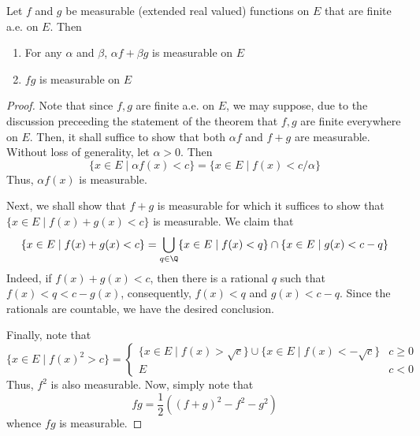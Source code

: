 \begin{theorem}
    Let $f$ and $g$ be measurable (extended real valued) functions on $E$ that are finite a.e. on $E$. Then 
    \begin{enumerate}[label=(\alph*)]
        \item For any $\alpha$ and $\beta$, $\alpha f + \beta g$ is measurable on $E$ 
        \item $fg$ is measurable on $E$
    \end{enumerate}
\end{theorem}
\begin{proof}
Note that since $f,g$ are finite a.e. on $E$, we may suppose, due to the discussion preceeding the statement of the theorem that $f,g$ are finite everywhere on $E$. Then, it shall suffice to show that both $\alpha f$ and $f + g$ are measurable. Without loss of generality, let $\alpha > 0$. Then 
\begin{equation*}
    \{x\in E\mid \alpha f(x) < c\} = \{x\in E\mid f(x) < c/\alpha\}
\end{equation*}
Thus, $\alpha f(x)$ is measurable. 

Next, we shall show that $f + g$ is measurable for which it suffices to show that $\{x\in E\mid f(x) + g(x) < c\}$ is measurable. We claim that 
\begin{equation*}
    \{x\in E\mid f(x) + g(x) < c\} = \bigcup_{q\in\Q}\{x\in E\mid f(x) < q\}\cap\{x\in E\mid g(x) < c - q\}
\end{equation*}
Indeed, if $f(x) + g(x) < c$, then there is a rational $q$ such that $f(x) < q < c - g(x)$, consequently, $f(x) < q$ and $g(x) < c - q$. Since the rationals are countable, we have the desired conclusion.

Finally, note that
\begin{equation*}
    \{x\in E\mid f(x)^2 > c\} = 
    \begin{cases}
        \{x\in E\mid f(x) > \sqrt{c}\}\cup\{x\in E\mid f(x) < -\sqrt{c}\} & c\ge 0\\
        E & c < 0
    \end{cases}
\end{equation*}
Thus, $f^2$ is also measurable. Now, simply note that 
\begin{equation*}
    fg = \frac{1}{2}\left((f + g)^2 - f^2 - g^2\right)
\end{equation*}
whence $fg$ is measurable.
\end{proof}

